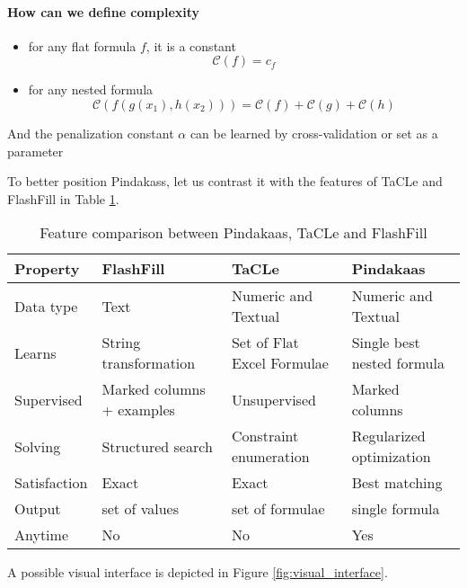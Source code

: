 \paragraph{How can we define complexity}
  \begin{itemize}
     \item for any flat formula $f$, it is a constant
       \begin{equation*}
         \mathcal{C}(f) = c_f 
       \end{equation*}
     \item for any nested formula 
       \begin{equation*}
       \mathcal{C}(f(g(x_1),h(x_2))) = \mathcal{C}(f) + \mathcal{C}(g) + \mathcal{C}(h)
       \end{equation*}
  \end{itemize}
  And the penalization constant $\alpha$ can be learned by cross-validation or set as a parameter

To better position Pindakass, let us contrast it with the features of
TaCLe and FlashFill in Table \ref{tab:pindakaas_features}.
\begin{table}
  \begin{tabularx}{\textwidth}{l | X | X | X }
    \textbf{Property} & \textbf{FlashFill} & \textbf{TaCLe} &
    \textbf{Pindakaas} \\ \hline
    Data type & Text & Numeric and Textual &  Numeric and
    Textual\\\hline
    Learns & String transformation & Set of Flat Excel Formulae
    & Single best nested formula\\\hline
    Supervised & Marked columns + examples & Unsupervised &
    Marked columns \\\hline
    Solving & Structured search & Constraint enumeration &
    Regularized optimization \\\hline
    Satisfaction & Exact & Exact &  Best
    matching\\\hline
    Output & set of values & set of formulae & single
    formula\\ \hline
    Anytime & No & No & Yes
  \end{tabularx}
  \caption{Feature comparison between Pindakaas, TaCLe and FlashFill}
  \label{tab:pindakaas_features}
\end{table}



A possible visual interface is depicted in Figure \ref{fig:visual_interface}.

